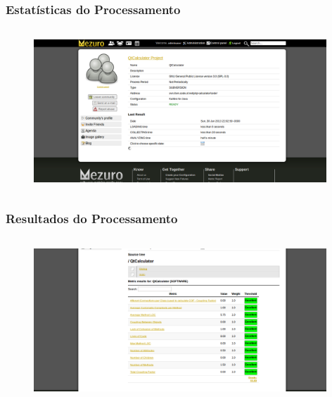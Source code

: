 \documentclass{beamer}
\begin{document}
    \begin{frame}
      \frametitle{Estatísticas do Processamento}
      \framesubtitle{}
    
      \begin{figure}
        \begin{center}
          \includegraphics[width=11cm, height=6cm]{images/08-processing-stats.png}
          \label{fig:processing-stats}
        \end{center}
      \end{figure}
    \end{frame}
    
    \begin{frame}
      \frametitle{Resultados do Processamento}
      \framesubtitle{}
    
      \begin{figure}
        \begin{center}
          \includegraphics[width=11cm, height=6cm]{images/09-processing-results.png}
          \label{fig:processing-results}
        \end{center}
      \end{figure}
    \end{frame}
    
\end{document}

